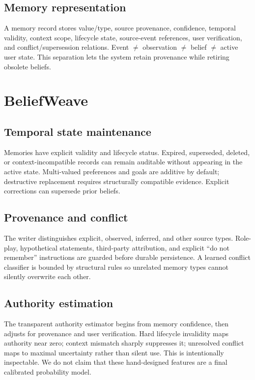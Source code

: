 \documentclass[10pt]{article}
\begin{document}
\subsection{Memory representation}
A memory record stores value/type, source provenance, confidence, temporal validity, context scope, lifecycle state, source-event references, user verification, and conflict/supersession relations. Event $\neq$ observation $\neq$ belief $\neq$ active user state. This separation lets the system retain provenance while retiring obsolete beliefs.

\begin{center}
\end{center}

\section{BeliefWeave}
\subsection{Temporal state maintenance}
Memories have explicit validity and lifecycle status. Expired, superseded, deleted, or context-incompatible records can remain auditable without appearing in the active state. Multi-valued preferences and goals are additive by default; destructive replacement requires structurally compatible evidence. Explicit corrections can supersede prior beliefs.

\subsection{Provenance and conflict}
The writer distinguishes explicit, observed, inferred, and other source types. Role-play, hypothetical statements, third-party attribution, and explicit ``do not remember'' instructions are guarded before durable persistence. A learned conflict classifier is bounded by structural rules so unrelated memory types cannot silently overwrite each other.

\subsection{Authority estimation}
The transparent authority estimator begins from memory confidence, then adjusts for provenance and user verification. Hard lifecycle invalidity maps authority near zero; context mismatch sharply suppresses it; unresolved conflict maps to maximal uncertainty rather than silent use. This is intentionally inspectable. We do not claim that these hand-designed features are a final calibrated probability model.
\end{document}
